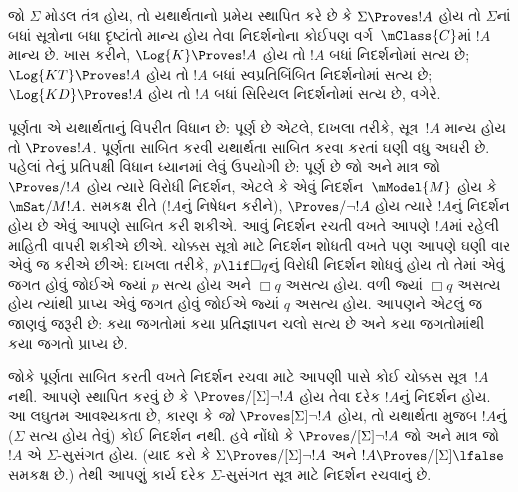 \OLEndChapterHook
\endgroup


\begingroup
\makeatletter{}\makeatother

\label{guunit:OLP-0441}


\begingroup
\makeatletter{}\makeatother


\label{guunit:OLP-0442}


જો $\Sigma$ મોડલ તંત્ર હોય, તો યથાર્થતાનો પ્રમેય સ્થાપિત કરે છે કે
$\Sigma \Proves !A$ હોય તો $\Sigma$નાં બધાં સૂત્રોના બધા
દૃષ્ટાંતો માન્ય હોય તેવા નિદર્શનોના કોઈપણ વર્ગ~$\mClass{C}$માં
$!A$ માન્ય છે. ખાસ કરીને, $\Log{K} \Proves !A$ હોય તો $!A$ બધાં
નિદર્શનોમાં સત્ય છે; $\Log{KT} \Proves !A$ હોય તો $!A$ બધાં
સ્વપ્રતિબિંબિત નિદર્શનોમાં સત્ય છે; $\Log{KD} \Proves !A$ હોય તો
$!A$ બધાં સિરિયલ નિદર્શનોમાં સત્ય છે, વગેરે.

પૂર્ણતા એ યથાર્થતાનું વિપરીત વિધાન છે:  પૂર્ણ છે એટલે, દાખલા
તરીકે, સૂત્ર~$!A$ માન્ય હોય તો $\Proves !A$. પૂર્ણતા
સાબિત કરવી યથાર્થતા સાબિત કરવા કરતાં ઘણી વધુ અઘરી છે. પહેલાં તેનું
પ્રતિપક્ષી વિધાન ધ્યાનમાં લેવું ઉપયોગી છે:  પૂર્ણ છે જો અને
માત્ર જો $\Proves/ !A$ હોય ત્યારે વિરોધી નિદર્શન, એટલે કે એવું
નિદર્શન~$\mModel{M}$ હોય કે $\mSat/{M}{!A}$. સમકક્ષ રીતે ($!A$નું
નિષેધન કરીને), $\Proves/ \lnot !A$ હોય ત્યારે $!A$નું નિદર્શન
હોય છે એવું આપણે સાબિત કરી શકીએ. આવું નિદર્શન રચતી વખતે આપણે
$!A$માં રહેલી માહિતી વાપરી શકીએ છીએ. ચોક્કસ સૂત્રો માટે
નિદર્શન શોધતી વખતે પણ આપણે ઘણી વાર એવું જ કરીએ છીએ: દાખલા તરીકે,
$p \lif \Box q$નું વિરોધી નિદર્શન શોધવું હોય તો તેમાં એવું જગત
હોવું જોઈએ જ્યાં $p$ સત્ય હોય અને $\Box q$ અસત્ય હોય. વળી જ્યાં
$\Box q$ અસત્ય હોય ત્યાંથી પ્રાપ્ય એવું જગત હોવું જોઈએ જ્યાં $q$
અસત્ય હોય. આપણને એટલું જ જાણવું જરૂરી છે: કયા જગતોમાં કયા
પ્રતિજ્ઞાપન ચલો સત્ય છે અને કયા જગતોમાંથી કયા જગતો
પ્રાપ્ય છે.

જોકે પૂર્ણતા સાબિત કરતી વખતે નિદર્શન રચવા માટે આપણી પાસે કોઈ
ચોક્કસ સૂત્ર~$!A$ નથી. આપણે સ્થાપિત કરવું છે કે
$\Proves/[\Sigma] \lnot !A$ હોય તેવા દરેક $!A$નું નિદર્શન હોય.
આ લઘુતમ આવશ્યકતા છે, કારણ કે \emph{જો} $\Proves[\Sigma] \lnot !A$
હોય, તો યથાર્થતા મુજબ $!A$નું ($\Sigma$ સત્ય હોય તેવું) કોઈ
નિદર્શન નથી. હવે નોંધો કે $\Proves/[\Sigma] \lnot !A$ જો અને માત્ર
જો $!A$ એ $\Sigma$-સુસંગત હોય. (યાદ કરો કે $\Sigma
\Proves/[\Sigma] \lnot !A$ અને $!A \Proves/[\Sigma] \lfalse$
સમકક્ષ છે.) તેથી આપણું કાર્ય દરેક $\Sigma$-સુસંગત સૂત્ર
માટે નિદર્શન રચવાનું છે.

